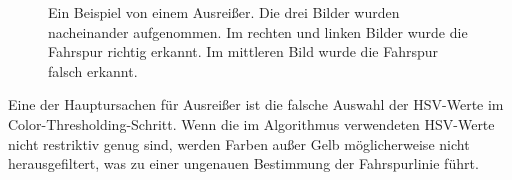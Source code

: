 \documentclass[arbeit=studie,oneside,BCOR=12mm]{ArbeitRST}
\begin{document}
\begin{figure}[h]
    \centering
    \caption{Ein Beispiel von einem Ausrei{\ss}er. Die drei Bilder wurden
    nacheinander aufgenommen. Im rechten und linken Bilder wurde die Fahrspur
    richtig erkannt. Im mittleren Bild wurde die Fahrspur falsch erkannt.}
    \label{ausrei}
\end{figure}

Eine der Hauptursachen für Ausreißer ist die falsche Auswahl der HSV-Werte im Color-Thresholding-Schritt.
Wenn die im Algorithmus verwendeten HSV-Werte nicht restriktiv genug sind,
werden Farben außer Gelb möglicherweise nicht herausgefiltert, was zu einer
ungenauen Bestimmung der Fahrspurlinie führt.
\end{document}
